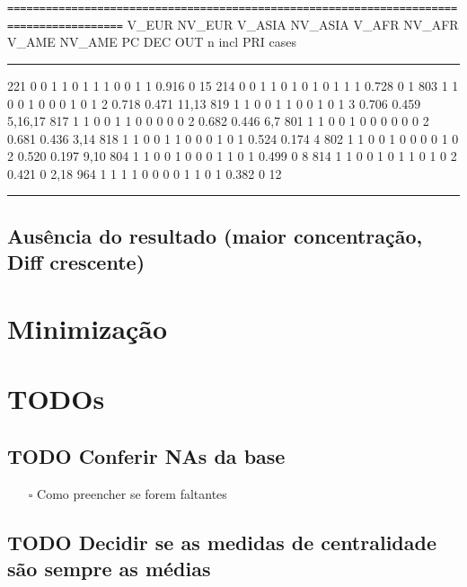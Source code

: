 \documentclass[11pt]{article}
\begin{document}
\texttt{========================================================================================}
    V\_EUR NV\_EUR V\_ASIA NV\_ASIA V\_AFR NV\_AFR V\_AME NV\_AME PC DEC OUT n incl   PRI   cases

\noindent\rule{\textwidth}{0.5pt}
221   0     0      1       1      0     1      1     1    0   0   1  1 0.916   0     15
214   0     0      1       1      0     1      0     1    0   1   1  1 0.728   0      1
803   1     1      0       0      1     0      0     0    1   0   1  2 0.718 0.471  11,13
819   1     1      0       0      1     1      0     0    1   0   1  3 0.706 0.459 5,16,17
817   1     1      0       0      1     1      0     0    0   0   0  2 0.682 0.446   6,7
801   1     1      0       0      1     0      0     0    0   0   0  2 0.681 0.436  3,14
818   1     1      0       0      1     1      0     0    0   1   0  1 0.524 0.174    4
802   1     1      0       0      1     0      0     0    0   1   0  2 0.520 0.197  9,10
804   1     1      0       0      1     0      0     0    1   1   0  1 0.499   0      8
814   1     1      0       0      1     0      1     1    0   1   0  2 0.421   0    2,18
964   1     1      1       1      0     0      0     0    1   1   0  1 0.382   0     12

\noindent\rule{\textwidth}{0.5pt}



\subsection*{Ausência do resultado (maior concentração, Diff crescente)}
\label{sec:org397cb7f}

\section*{Minimização}
\label{sec:org2112217}

\section*{TODOs}
\label{sec:org4dd040a}


\subsection*{{\bfseries\sffamily TODO} Conferir NAs da base}
\label{sec:org0b361c2}
\begin{itemize}
\item[{$\square$}] Como preencher se forem faltantes
\end{itemize}

\subsection*{{\bfseries\sffamily TODO} Decidir se as medidas de centralidade são sempre as médias}
\label{sec:org4f7d31c}
\end{document}
